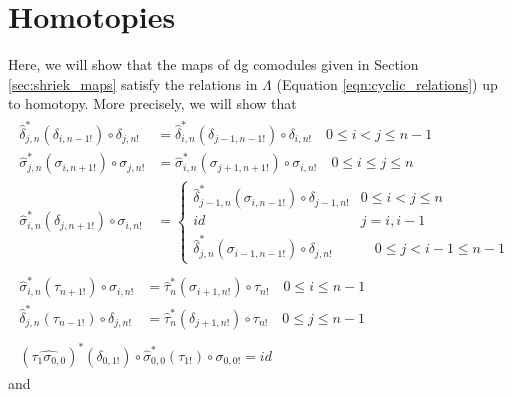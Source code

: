 \section{Homotopies}
Here, we will show that the maps 
of dg comodules given in Section 
\ref{sec:shriek_maps} satisfy the 
relations in $\Lambda$ (Equation 
\ref{eqn:cyclic_relations}) up to 
homotopy. More precisely, we will 
show that
\begin{subequations}\label{eq:strict}
\begin{align}
\begin{split}\label{eq:strict_1}
\hat{\delta}_{j,n}^*(\delta_{i,n-1!}) \circ \delta_{j,n!} 
&= 
\hat{\delta}_{i,n}^*(\delta_{j-1,n-1!}) \circ \delta_{i,n!} 
  \quad 0 \leq i < j \leq n-1 \\
\hat{\sigma}_{j,n}^*(\sigma_{i,n+1!}) \circ \sigma_{j,n!} 
&= 
\hat{\sigma}_{i,n}^*(\sigma_{j+1,n+1!}) \circ \sigma_{i,n!}
  \quad 0 \leq i \leq j \leq n \\
\hat{\sigma}_{i,n}^*(\delta_{j,n+1!}) \circ \sigma_{i,n!} 
&= 
  \begin{cases}
    \hat{\delta}_{j-1,n}^*(\sigma_{i,n-1!}) \circ \delta_{j-1,n!} 
      & 0 \leq i < j \leq n\\
    id & j = i, i-1\\
    \hat{\delta}_{j,n}^*(\sigma_{i-1,n-1!}) \circ \delta_{j,n!} 
      & \quad 0 \leq j < i-1 \leq n-1
   \end{cases}
\end{split}\\
\begin{split}\label{eq:strict_2}
\hat{\sigma}_{i,n}^*(\tau_{n+1!}) \circ \sigma_{i,n!} 
&= 
\hat{\tau}_n^*(\sigma_{i+1,n!}) \circ \tau_{n!}
  \quad 0 \leq i \leq n-1\\
\hat{\delta}_{j,n}^*(\tau_{n-1!}) \circ \delta_{j,n!} 
&= 
\hat{\tau}_n^*(\delta_{j+1,n!}) \circ \tau_{n!}
  \quad 0 \leq j \leq n-1
\end{split}\\
\begin{split}\label{eq:strict_3}
(\widehat{\tau_{1}\sigma_{0,0}})^*
  (\delta_{0,1!}) \circ
  \hat{\sigma}_{0,0}^*(\tau_{1!}) \circ 
  \sigma_{0,0!}
= id
\end{split} 
\end{align}
\end{subequations}
and 
